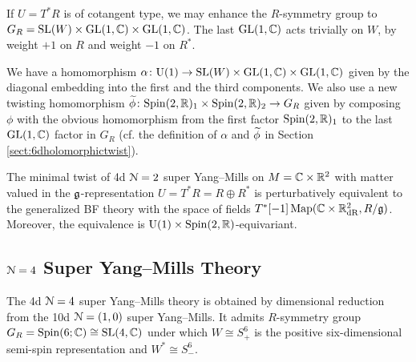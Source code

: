\documentclass[10pt, oneside]{article}
\renewcommand{\U}{\mathrm{U}}
\begin{document}
If $U = T^* R$ is of cotangent type, we may enhance the $R$-symmetry group to $G_R=\mathrm{SL}(W)\times \mathrm{GL}(1, \mathbb C)\times \mathrm{GL}(1, \mathbb C)$. The last $\mathrm{GL}(1, \mathbb C)$ acts trivially on $W$, by weight $+1$ on $R$ and weight $-1$ on $R^*$.

We have a homomorphism $\alpha\colon \U(1)\rightarrow  \SL(W)\times \GL(1, \CC) \times \GL(1, \CC)$ given by the diagonal embedding into the first and the third components. We also use a new twisting homomorphism $\widetilde{\phi}\colon \mathrm{Spin}(2, \mathbb R)_1 \times \mathrm{Spin}(2, \mathbb R)_2\rightarrow G_R$ given by composing $\phi$ with the obvious homomorphism from the first factor $\mathrm{Spin}(2, \mathbb R)_1$ to the last $\mathrm{GL}(1, \mathbb C)$ factor in $G_R$ (cf. the definition of $\alpha$ and $\widetilde{\phi}$ in Section \ref{sect:6dholomorphictwist}).

\begin{theorem}\label{thm:4d_11_twistgraded}
The minimal twist of 4d $\mathcal N=2$ super Yang--Mills on $M=\mathbb C \times \mathbb R^2$ with matter valued in the $\mathfrak g$-representation $U=T^* R=R\oplus R^*$ is perturbatively equivalent to the generalized BF theory with the space of fields $T^*[-1]\operatorname{Map}(\mathbb C \times \mathbb R^2_{\mathrm{dR}}, R/\mathfrak g)$. Moreover, the equivalence is $\U(1)\times \Spin(2, \RR)$-equivariant.
\end{theorem}

\subsection{\texorpdfstring{$\mathcal N=4$}{N=4} Super Yang--Mills Theory} \label{4d_4_section}

The 4d $\mathcal N=4$ super Yang--Mills theory is obtained by dimensional reduction from the 10d $\mathcal N=(1, 0)$ super Yang--Mills. It admits $R$-symmetry group $G_R=\mathrm{Spin}(6; \mathbb C)\cong \mathrm{SL}(4, \mathbb C)$ under which $W \cong S_+^6$ is the positive six-dimensional semi-spin representation and $W^* \cong S_-^6$. 
\end{document}
